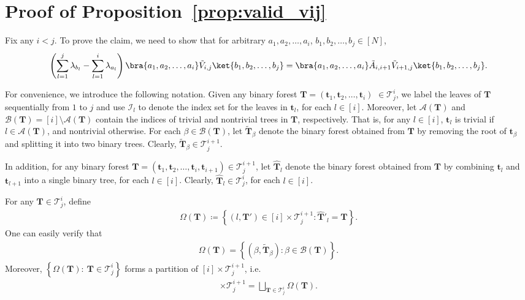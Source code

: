 \documentclass[superscriptaddress,onecolumn,nofootinbib,longbibliography,a4paper,accepted=2026-09-29]{quantumarticle}
\theoremstyle{plain}
\theoremstyle{definition}
\numberwithin{thm}{section}
\numberwithin{assumption}{section}
\numberwithin{lemma}{section}
\numberwithin{prop}{section}
\numberwithin{cor}{section}
\numberwithin{definition}{section}
\numberwithin{rmk}{section}
\numberwithin{equation}{section}
\newcommand{\lrb}[1]{\left ( #1 \right )}
\newcommand{\lrcb}[1]{\left \{ #1 \right \}}
\newcommand{\defeq}{\coloneqq}
\newcommand{\mbt}{\mathbf{t}}
\newcommand{\mbf}{\mathbf{T}}
\begin{document}
\section{Proof of Proposition~\ref{prop:valid_vij}}
\label{app:proof_lemma_valid_vij}

Fix any $i<j$. To prove the claim, we need to show that 
 for arbitrary $a_1,a_2,\dots, a_i$, $b_1,b_2,\dots,b_j \in [N]$, 
\begin{align}
\lrb{\sum_{l=1}^j \lambda_{b_l}-
\sum_{l=1}^i \lambda_{a_l}}\bra{a_1,a_2,\dots, a_i}  \tilde{V}_{i,j}\ket{b_1,b_2,\dots,b_j} = \bra{a_1,a_2,\dots, a_i} \tilde{A}_{i,i+1} \tilde{V}_{i+1,j} \ket{b_1,b_2,\dots,b_j}.     
\label{eq:vij_recursive_relation}
\end{align}

For convenience, we introduce the following notation. Given any binary forest $\mbf=(\mbt_1,\mbt_2,\dots,\mbt_i)$ $\in \mathcal{T}^i_j$, we label the leaves of $\mbf$ sequentially from $1$ to $j$ and use $\mathcal{I}_l$ to denote the index set for the leaves in $\mathbf{t}_l$, for each $l \in [i]$. Moreover, let $\mathcal{A}(\mbf)$ and $\mathcal{B}(\mbf)=[i] \setminus \mathcal{A}(\mbf)$ contain the indices of trivial and nontrivial trees in $\mbf$, respectively. That is, for any $l \in [i]$, $\mathbf{t}_l$ is trivial if $l \in \mathcal{A}(\mbf)$, and nontrivial otherwise. For each \( \beta \in \mathcal{B}(\mbf) \), let \( \tilde{\mbf}_\beta \) denote the binary forest obtained from $\mbf$ by removing the root of $\mathbf{t}_{\beta}$ and splitting it into two binary trees. Clearly,  $\tilde{\mbf}_\beta \in \mathcal{T}^{i+1}_{j}$.  

In addition, for any binary forest \( \mbf = (\mathbf{t}_1, \mathbf{t}_2, \dots, \mathbf{t}_i, \mathbf{t}_{i+1}) \in \mathcal{T}^{i+1}_{j} \), let $\hat{\mbf}_l$ denote the binary forest obtained from $\mbf$ by combining $\mathbf{t}_l$ and $\mathbf{t}_{l+1}$ into a single binary tree, for each $l \in [i]$. Clearly,  $\hat{\mbf}_l \in \mathcal{T}^i_j$, for each $l \in [i]$.  

For any $\mbf \in \mathcal{T}^i_j$, define
\begin{align}
    \Omega(\mbf) \defeq \lrcb{(l, \mbf') \in [i]\times \mathcal{T}^{i+1}_j: \hat{\mbf}'_l = \mbf}.
\end{align}
One can easily verify that
\begin{align}
    \Omega(\mbf) = \lrcb{(\beta, \tilde{\mbf}_\beta): \beta \in \mathcal{B}(\mbf)}.
    \label{eq:omegaf_def}
\end{align}
Moreover, $\lrcb{\Omega(\mbf):~\mbf \in \mathcal{T}^i_j}$ forms a partition of $[i]\times \mathcal{T}^{i+1}_j$, i.e.
\begin{align}
[i]\times \mathcal{T}^{i+1}_{j} =  \bigsqcup_{\mbf \in \mathcal{T}^i_j} \Omega(\mbf).
\label{eq:omegaf_partition}
\end{align}
\end{document}
